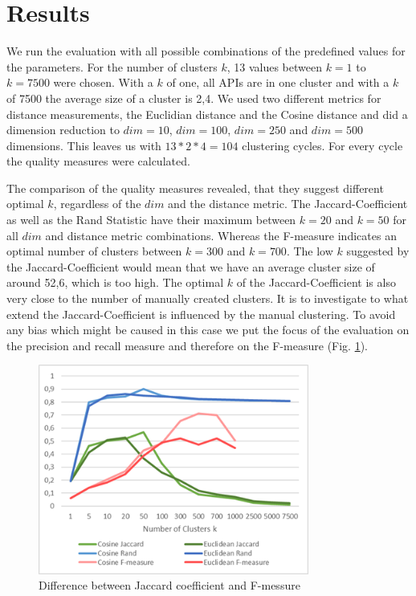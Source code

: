 \documentclass[a4paper]{IEEEtran}
\begin{document}
\section{Results}
\label{sec:result}
We run the evaluation with all possible combinations of the predefined values for the parameters. For the number of clusters $k$, 13 values between $k=1$ to $k=7500$ were chosen. With a $k$ of one, all APIs are in one cluster and with a $k$ of 7500 the average size of a cluster is 2,4. We used two different metrics for distance measurements, the Euclidian distance and the Cosine distance and did a dimension reduction to $dim⁡= 10$, $dim⁡= 100$, $dim⁡=  250$ and  $dim⁡= 500$ dimensions. This leaves us with $13*2*4=104$ clustering cycles. For every cycle the quality measures were calculated.

The comparison of the quality measures revealed, that they suggest different optimal $k$, regardless of the $dim$ and the distance metric. The Jaccard-Coefficient as well as the Rand Statistic have their maximum between $k=20$ and $k=50$ for all $dim$ and distance metric combinations. Whereas the F-measure indicates an optimal number of clusters between $k=300$ and $k=700$.
The low $k$ suggested by the Jaccard-Coefficient would mean that we have an average cluster size of around 52,6, which is too high. The optimal $k$ of the Jaccard-Coefficient is also very close to the number of manually  created clusters. It is to investigate to what extend the Jaccard-Coefficient is influenced by the manual clustering. To avoid any bias which might be caused in this case we put the focus of the evaluation on the precision and recall measure and therefore on the F-measure (Fig. \ref{fig_sim4}).


\begin{figure}[!t]
\centering
\includegraphics[width= 3.5in]{img/Jaccard.png}
\caption{Difference between Jaccard coefficient and F-messure}
\label{fig_sim4}
\end{figure}
\end{document}

